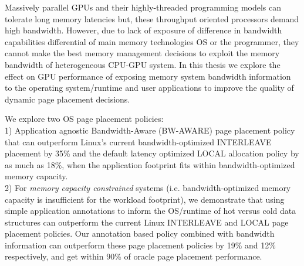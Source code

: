 
Massively parallel GPUs and their highly-threaded programming models can
tolerate long memory latencies but, these throughput oriented processors demand
high bandwidth. However, due to lack of exposure of difference in bandwidth
capabilities differential of main memory technologies OS or the programmer, they
cannot make the best memory management decisions to exploit the memory bandwidth
of heterogeneous CPU-GPU system. In this thesis we explore the effect on GPU
performance of exposing memory system bandwidth information to the operating
system/runtime and user applications to improve the quality of dynamic page
placement decisions.

We explore two OS page placement policies:\\
1) Application agnostic Bandwidth-Aware (BW-AWARE) page placement policy that
can outperform Linux's current bandwidth-optimized INTERLEAVE placement by 35\%
and the default latency optimized LOCAL allocation policy by as much as 18\%,
when the application footprint fits within bandwidth-optimized memory capacity.  
\\
2) For \emph{memory capacity constrained} systems (i.e. bandwidth-optimized memory
capacity is insufficient for the workload footprint), we demonstrate that using
simple application annotations to inform the OS/runtime of hot versus
cold data structures can outperform the current Linux
INTERLEAVE and LOCAL page placement policies.  Our annotation
based policy combined with bandwidth information can outperform these
page placement policies by 19\% and 12\% respectively, and get within
90\% of oracle page placement performance.

